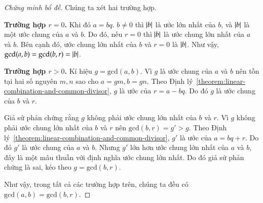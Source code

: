 \begin{proof}[Chứng minh bổ đề]
    Chúng ta xét hai trường hợp.

    \textbf{Trường hợp $r = 0$.} Khi đó $a = b q$. $b\ne 0$ thì $\left\vert{b}\right\vert$ là ước lớn nhất của $b$, và $\left\vert{b}\right\vert$ là một ước chung của $a$ và $b$. Do đó, nếu $r = 0$ thì $\left\vert{b}\right\vert$ là ước chung lớn nhất của $a$ và $b$. Bên cạnh đó, ước chung lớn nhất của $b$ và $r = 0$ là $\left\vert{b}\right\vert$. Như vậy, $\text{gcd}(a, b) = \text{gcd}(b, r) = \left\vert{b}\right\vert$.

    \textbf{Trường hợp $r > 0$.} Kí hiệu $g = \text{gcd}(a, b)$. Vì $g$ là ước chung của $a$ và $b$ nên tồn tại hai số nguyên $m, n$ sao cho $a = g m, b = g n$. Theo Định lý~\ref{theorem:linear-combination-and-common-divisor}, $g$ là ước của $r = a - b q$. Do đó $g$ là ước chung của $b$ và $r$.

    Giả sử phản chứng rằng $g$ không phải ước chung lớn nhất của $b$ và $r$. Vì $g$ không phải ước chung lớn nhất của $b$ và $r$ nên $\text{gcd}(b, r) = g' > g$. Theo Định lý~\ref{theorem:linear-combination-and-common-divisor}, $g'$ là ước của $a = b q + r$.  Do đó $g'$ là ước chung của $a$ và $b$. Nhưng $g'$ lớn hơn ước chung lớn nhất của $a$ và $b$, đây là một mâu thuẫn với định nghĩa ước chung lớn nhất. Do đó giả sử phản chứng là sai, kéo theo $g = \text{gcd}(b, r)$.

    Như vậy, trong tất cả các trường hợp trên, chúng ta đều có $\text{gcd}(a, b) = \text{gcd}(b, r)$.
\end{proof}

